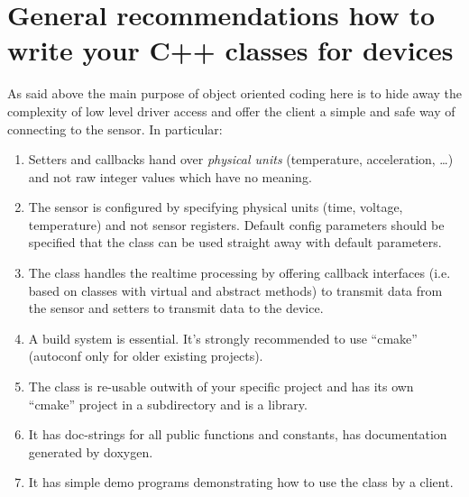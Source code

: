 \documentclass[12pt]{report}
\begin{document}
\section{General recommendations how to write your C++ classes for devices}
As said above the main purpose of object oriented coding here is to
hide away the complexity of low level driver access and offer the
client a simple and safe way of connecting to the sensor. In
particular:
\begin{enumerate}
\item Setters and callbacks hand over \textsl{physical units}
  (temperature, acceleration, \ldots) and not raw integer values which
  have no meaning.
\item The sensor is configured by specifying physical units (time,
  voltage, temperature) and not sensor registers. Default config parameters
  should be specified that the class can be used straight away with
  default parameters.
\item The class handles the realtime processing by offering callback
  interfaces (i.e. based on classes with virtual and abstract methods)
  to transmit data from the sensor and setters to transmit data to the device.
\item A build system is essential. It's strongly recommended to use ``cmake''
  (autoconf only for older existing projects).
\item The class is re-usable outwith of your specific project and has
  its own ``cmake'' project in a subdirectory and is a
  library.
\item It has doc-strings for all public functions and constants,
  has documentation generated by doxygen.
\item It has simple demo programs demonstrating how to use the class
  by a client.
\end{enumerate}
\end{document}
